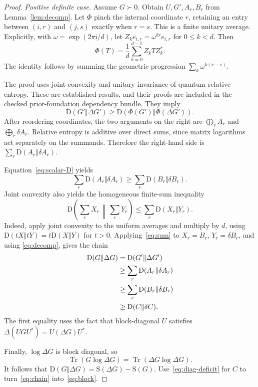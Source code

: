 \documentclass[11pt,a4paper]{article}
\newcommand{\tr}{\operatorname{Tr}}
\newcommand{\Ent}{\mathrm{S}}
\newcommand{\Rel}{\mathrm{D}}
\begin{document}
\begin{proof}
\emph{Positive definite case.} Assume $G\succ0$. Obtain $U,G',A_r,B_r$
from Lemma~\ref{lem:decomp}. Let $\Phi$ pinch the internal coordinate
$r$, retaining an entry between $(i,r)$ and $(j,s)$ exactly when $r=s$.
This is a finite unitary average. Explicitly, with
$\omega=\exp(2\pi\mathrm{i}/d)$, let
$Z_k e_{i,r}=\omega^{kr}e_{i,r}$ for $0\le k<d$. Then
\[
 \Phi(T)=\frac1d\sum_{k=0}^{d-1}Z_kTZ_k^*.
\]
The identity follows by summing the geometric progression
$\sum_k\omega^{k(r-s)}$.

The proof uses joint convexity and unitary invariance of quantum relative entropy.
These are established results, and their proofs are included in the
checked prior-foundation dependency bundle. They imply
\begin{equation}\label{eq:pinch}
 \Rel(G'\Vert\Delta G')
 \ge \Rel(\Phi(G')\Vert\Phi(\Delta G')).
\end{equation}
After reordering coordinates, the two arguments on the right are
$\bigoplus_r A_r$ and $\bigoplus_r\delta A_r$. Relative entropy is
additive over direct sums, since matrix logarithms act separately on the
summands. Therefore the right-hand side is
$\sum_r\Rel(A_r\Vert\delta A_r)$.

Equation~\eqref{eq:scalar-D} yields
\[
 \sum_r\Rel(A_r\Vert\delta A_r)
 \ge\sum_r\Rel(B_r\Vert\delta B_r).
\]
Joint convexity also yields the homogeneous finite-sum inequality
\begin{equation}\label{eq:sum}
 \Rel\left(\sum_r X_r\,\middle\Vert\,\sum_rY_r\right)
 \le\sum_r\Rel(X_r\Vert Y_r).
\end{equation}
Indeed, apply joint convexity to the uniform averages and multiply by
$d$, using $\Rel(tX\Vert tY)=t\Rel(X\Vert Y)$ for $t>0$.
Applying~\eqref{eq:sum} to $X_r=B_r$, $Y_r=\delta B_r$, and using
\eqref{eq:decomp}, gives the chain
\begin{align}\label{eq:chain}
 \Rel(G\Vert\Delta G)
 &=\Rel(G'\Vert\Delta G')\notag\\
 &\ge\sum_r\Rel(A_r\Vert\delta A_r)\notag\\
 &\ge\sum_r\Rel(B_r\Vert\delta B_r)\notag\\
 &\ge\Rel(C\Vert\delta C).
\end{align}
The first equality uses the fact that block-diagonal $U$ satisfies
$\Delta(UGU^*)=U(\Delta G)U^*$.

Finally, $\log\Delta G$ is block diagonal, so
\[
 \tr(G\log\Delta G)=\tr(\Delta G\log\Delta G).
\]
It follows that
$\Rel(G\Vert\Delta G)=\Ent(\Delta G)-\Ent(G)$.
Use~\eqref{eq:diag-deficit} for $C$ to turn~\eqref{eq:chain}
into~\eqref{eq:block}.


\end{proof}
\end{document}
